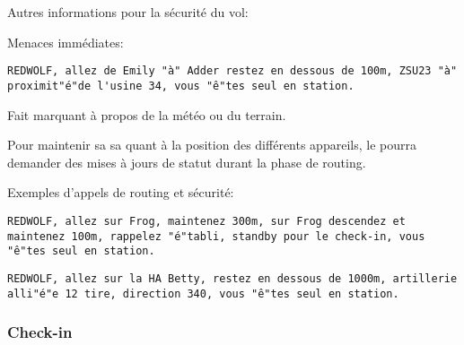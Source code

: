\begin{e1}
	\item Autres informations pour la sécurité du vol:
	
	\begin{e2}
		
		
		
		\begin{minipage}{\linewidth}
			\item Menaces immédiates:
			
			\begin{lstlisting}[caption=Routing: menace immédiate, label=routingthreat]
	REDWOLF, allez de Emily "à" Adder restez en dessous de 100m, ZSU23 "à" proximit"é"de l'usine 34, vous "ê"tes seul en station.
			\end{lstlisting}
		\end{minipage}
		
		\item Fait marquant à propos de la météo ou du terrain.
		
	\end{e2}
	
	\item Pour maintenir sa \gls{sa} quant à la position des différents appareils, le \ja{} pourra demander des mises à jours de statut durant la phase de routing.
	
	\begin{minipage}{\linewidth}
		\item Exemples d'appels de routing et sécurité:
		
		\begin{lstlisting}[caption=Routing: exemple 1, label=routingex1]
	REDWOLF, allez sur Frog, maintenez 300m, sur Frog descendez et maintenez 100m, rappelez "é"tabli, standby pour le check-in, vous "ê"tes seul en station.
		\end{lstlisting}
		
		\begin{lstlisting}[caption=Routing: exemple 2, label=routingex2]
	REDWOLF, allez sur la HA Betty, restez en dessous de 1000m, artillerie alli"é"e 12 tire, direction 340, vous "ê"tes seul en station.
		\end{lstlisting}
	\end{minipage}

\end{e1}

\subsubsection{Check-in}

